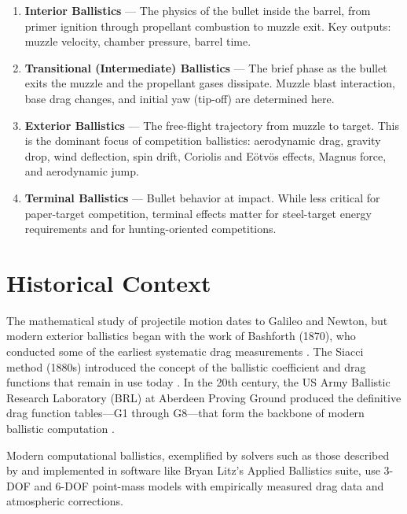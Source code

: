 \documentclass[11pt,twoside,openright]{report}
\begin{document}
\begin{enumerate}[label=\textbf{\arabic*.}]
  \item \textbf{Interior Ballistics} --- The physics of the bullet inside the barrel, from primer ignition through propellant combustion to muzzle exit. Key outputs: muzzle velocity, chamber pressure, barrel time.
  \item \textbf{Transitional (Intermediate) Ballistics} --- The brief phase as the bullet exits the muzzle and the propellant gases dissipate. Muzzle blast interaction, base drag changes, and initial yaw (tip-off) are determined here.
  \item \textbf{Exterior Ballistics} --- The free-flight trajectory from muzzle to target. This is the dominant focus of competition ballistics: aerodynamic drag, gravity drop, wind deflection, spin drift, Coriolis and E\"otv\"os effects, Magnus force, and aerodynamic jump.
  \item \textbf{Terminal Ballistics} --- Bullet behavior at impact. While less critical for paper-target competition, terminal effects matter for steel-target energy requirements and for hunting-oriented competitions.
\end{enumerate}

\section{Historical Context}

The mathematical study of projectile motion dates to Galileo and Newton, but modern exterior ballistics began with the work of Bashforth (1870), who conducted some of the earliest systematic drag measurements \citep{bashforth1870description}. The Siacci method (1880s) introduced the concept of the ballistic coefficient and drag functions that remain in use today \citep{siacci1888balistica}. In the 20th century, the US Army Ballistic Research Laboratory (BRL) at Aberdeen Proving Ground produced the definitive drag function tables---G1 through G8---that form the backbone of modern ballistic computation \citep{mccoy1999modern, ingalls1893exterior}.

Modern computational ballistics, exemplified by solvers such as those described by \citet{litz2011applied} and implemented in software like Bryan Litz's Applied Ballistics suite, use 3-DOF and 6-DOF point-mass models with empirically measured drag data and atmospheric corrections.


\end{document}
